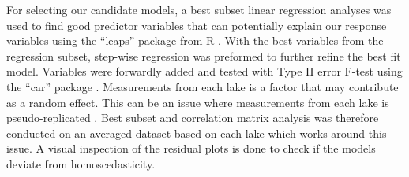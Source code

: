 For selecting our candidate models, a best subset linear regression analyses was used to find good predictor variables that can potentially explain our response variables using the ``leaps'' package from R \cite{miller_leaps:_2017}. With the best variables from the regression subset, step-wise regression was preformed to further refine the best fit model. Variables were forwardly added and tested with Type II error F-test using the ``car'' package \cite{kenward_method_1987, fox_r_2011}. Measurements from each lake is a factor that may contribute as a random effect. This can be an issue where measurements from each lake is pseudo-replicated \cite{eisenhart_assumptions_1947}. Best subset and correlation matrix analysis was therefore conducted on an averaged dataset based on each lake which works around this issue. A visual inspection of the residual plots is done to check if the models deviate from homoscedasticity.  




